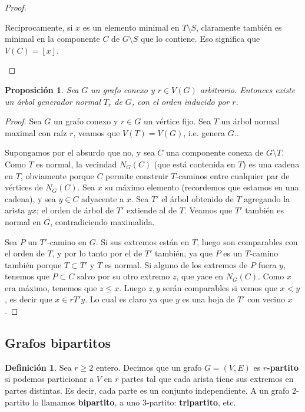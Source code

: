 \documentclass[12pt]{report}
\theoremstyle{plain}
\newtheorem{proposition}[theorem]{Proposición}
\theoremstyle{definition}
\newtheorem{definition}[theorem]{Definición}
\newenvironment{Definition}{\colorlet{shadecolor}{Apricot!12} \begin{shaded} \begin{definition} }{ \end{definition} \end{shaded} }
\newcommand{\floor}[1]{\left\lfloor #1  \right\rfloor}
\begin{document}
\begin{proof}
\begin{enumerate}[(i)]
Recíprocamente, si $x$ es un elemento minimal en $T \setminus S$, claramente también es minimal en la componente $C$ de $G \setminus S$ que lo contiene. Eso significa que $V(C) = \floor x$.
\end{enumerate}
\end{proof}


\begin{proposition}
Sea $G$ un grafo conexo y $r \in V(G)$ arbitrario. Entonces existe un árbol generador normal $T_r$ de $G$, con el orden
inducido
por $r$.
\end{proposition}
\begin{proof}
Sea $G$ un grafo conexo y $r \in G$ un vértice fijo. Sea $T$ un árbol normal maximal con raíz $r$, veamos que $V(T) = V(G)$, i.e. genera $G$..

Supongamos por el absurdo que no, y sea $C$ una componente conexa de $G \setminus T$. Como $T$ es normal, la vecindad $N_G (C)$ (que está contenida en $T$) es una cadena en $T$, obviamente porque $C$ permite construir $T$-caminos entre cualquier par de vértices de $N_G(C)$. Sea $x$ su máximo elemento (recordemos que estamos en una cadena), y sea $y \in C$ adyacente a $x$. Sea $T'$ el árbol obtenido de $T$ agregando la arista $yx$; el orden de árbol de $T'$ extiende al de $T$. Veamos que $T'$ también es normal en $G$, contradiciendo maximalida.

Sea $P$ un $T'$-camino en $G$. Si sus extremos están en $T$, luego son comparables con el orden de $T$, y por lo tanto por el de $T'$ también, ya que $P$ es un $T$-camino también porque $T \subset T'$ y $T$ es normal. Si alguno de los extremos de $P$ fuera $y$, tenemos que $P \subset C$ salvo por su otro extremo $z$, que yace en $N_G(C)$. Como $x$ era máximo, tenemos que $z \leq x$. Luego $z,y$ serán comparables si vemos que $x < y$, es decir que $x \in r T' y$. Lo cual es claro ya que $y$ es una hoja de $T'$ con vecino $x$.
\end{proof}




\subsection{Grafos bipartitos}

\begin{Definition}
Sea $r \geq 2$ entero. Decimos que un grafo $G = (V,E)$ es \textbf{$r$-partito} si podemos particionar a $V$ en $r$ partes tal que cada arista tiene sus extremos en partes distintas. Es decir, cada parte es un conjunto independiente. A un grafo $2$-partito lo llamamos \textbf{bipartito}, a uno $3$-partito: \textbf{tripartito}, etc.
\end{Definition}
\end{document}
